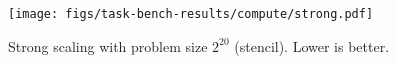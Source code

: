 \begin{figure}[t]
\centering
\texttt{[image: figs/task-bench-results/compute/strong.pdf]}
\vspace{-0.5cm}
\caption{Strong scaling with problem size $2^{20}$ (stencil). Lower is better.\label{fig:strong-scaling}}
\vspace{-0.05cm}
\end{figure}
